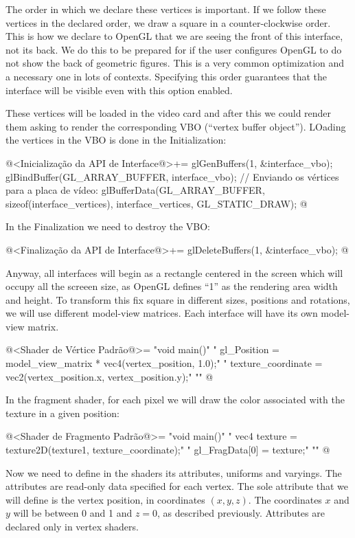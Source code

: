 The order in which we declare these vertices is important. If we
follow these vertices in the declared order, we draw a square in a
counter-clockwise order. This is how we declare to OpenGL that we are
seeing the front of this interface, not its back. We do this to be
prepared for if the user configures OpenGL to do not show the back of
geometric figures. This is a very common optimization and a necessary
one in lots of contexts. Specifying this order guarantees that the
interface will be visible even with this option enabled.

These vertices will be loaded in the video card and after this we
could render them asking to render the corresponding VBO (``vertex
buffer object''). LOading the vertices in the VBO is done in the
Initialization:

\iniciocodigo
@<Inicialização da API de Interface@>+=
glGenBuffers(1, &interface_vbo);
glBindBuffer(GL_ARRAY_BUFFER, interface_vbo);
// Enviando os vértices para a placa de vídeo:
glBufferData(GL_ARRAY_BUFFER, sizeof(interface_vertices), interface_vertices,
             GL_STATIC_DRAW);
@
\fimcodigo

In the Finalization we need to destroy the VBO:

\iniciocodigo
@<Finalização da API de Interface@>+=
glDeleteBuffers(1, &interface_vbo);
@
\fimcodigo

Anyway, all interfaces will begin as a rectangle centered in the
screen which will occupy all the screeen size, as OpenGL defines ``1''
as the rendering area width and height. To transform this fix square
in different sizes, positions and rotations, we will use different
model-view matrices. Each interface will have its own model-view
matrix.

\iniciocodigo
@<Shader de Vértice Padrão@>=
"void main(){\n"
"  gl_Position = model_view_matrix * vec4(vertex_position, 1.0);\n"
"  texture_coordinate = vec2(vertex_position.x, vertex_position.y);\n"
"}\n"
@
\fimcodigo


In the fragment shader, for each pixel we will draw the color
associated with the texture in a given position:

\iniciocodigo
@<Shader de Fragmento Padrão@>=
"void main(){\n"
"  vec4 texture = texture2D(texture1, texture_coordinate);\n"
"  gl_FragData[0] = texture;\n"
"}\n"
@
\fimcodigo

Now we need to define in the shaders its attributes, uniforms and
varyings. The attributes are read-only data specified for each vertex.
The sole attribute that we will define is the vertex position, in
coordinates $(x, y, z)$. The coordinates $x$ and $y$ will be between 0
and 1 and $z=0$, as described previously. Attributes are declared only
in vertex shaders.


